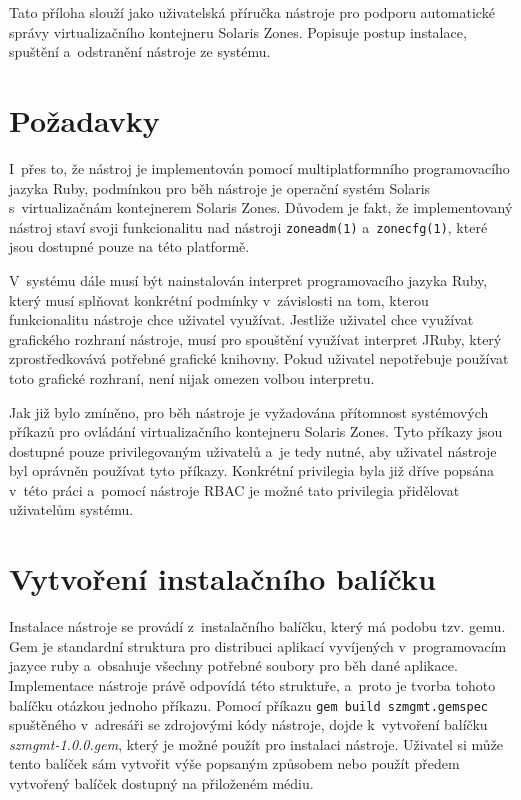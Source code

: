 \label{appendix:installation}
Tato příloha slouží jako uživatelská příručka nástroje pro podporu automatické správy virtualizačního kontejneru Solaris Zones.
Popisuje postup instalace, spuštění a~odstranění nástroje ze systému.
\section{Požadavky}
\label{appendix:installation:demands}
I~přes to, že nástroj je implementován pomocí multiplatformního programovacího jazyka Ruby, podmínkou pro běh nástroje je operační
systém Solaris s~virtualizačnám kontejnerem Solaris Zones. Důvodem je fakt, že implementovaný nástroj staví svoji funkcionalitu
nad nástroji \texttt{zoneadm(1)} a~\texttt{zonecfg(1)}, které jsou dostupné pouze na této platformě.

V~systému dále musí být nainstalován interpret programovacího jazyka Ruby, který musí splňovat konkrétní podmínky v~závislosti na tom,
kterou funkcionalitu nástroje chce uživatel využívat. Jestliže uživatel chce využívat grafického rozhraní nástroje, musí pro
spouštění využívat interpret JRuby, který zprostředkovává potřebné grafické knihovny. Pokud uživatel nepotřebuje používat
toto grafické rozhraní, není nijak omezen volbou interpretu.

Jak již bylo zmíněno, pro běh nástroje je vyžadována přítomnost systémových příkazů pro ovládání virtualizačního kontejneru Solaris
Zones. Tyto příkazy jsou dostupné pouze privilegovaným uživatelů a~je tedy nutné, aby uživatel nástroje byl oprávněn používat 
tyto příkazy. Konkrétní privilegia byla již dříve popsána v~této práci a~pomocí nástroje RBAC je možné tato privilegia přidělovat
uživatelům systému.
\section{Vytvoření instalačního balíčku}
\label{appendix:installation:package}
Instalace nástroje se provádí z~instalačního balíčku, který má podobu tzv. gemu. Gem je standardní struktura pro distribuci aplikací
vyvíjených v~programovacím jazyce ruby a~obsahuje všechny potřebné soubory pro běh dané aplikace. Implementace nástroje právě
odpovídá této struktuře, a~proto je tvorba tohoto balíčku otázkou jednoho příkazu. Pomocí příkazu \texttt{gem build szmgmt.gemspec}
spuštěného v~adresáři se zdrojovými kódy nástroje, dojde k~vytvoření balíčku \textit{szmgmt-1.0.0.gem}, který je možné použít
pro instalaci nástroje. Uživatel si může tento balíček sám vytvořit výše popsaným způsobem nebo použít předem vytvořený balíček 
dostupný na přiloženém médiu.
